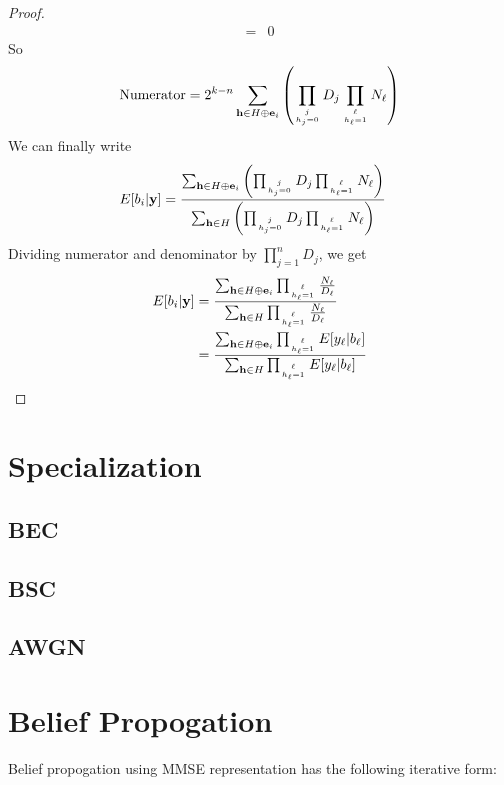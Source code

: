 \documentclass[12pt]{article}
\newcommand{\vect}[1]{\mathbf{#1}}
\begin{document}
\begin{proof}
\begin{align}
=&0
\end{align}
So
\begin{align}
\text{Numerator}=2^{k-n}\sum_{\vect{h}\in H\oplus\vect{e}_i}\left(\prod_{j\atop h_j = 0}D_j\prod_{\ell\atop h_\ell = 1} N_\ell\right)
\end{align}
We can finally write
\begin{align}
E[b_i|\vect{y}] &= \frac{\sum_{\vect{h}\in H\oplus\vect{e}_i}\left(\prod_{j\atop h_j = 0}D_j\prod_{\ell\atop h_\ell = 1} N_\ell\right)}{\sum_{\vect{h}\in H}\left(\prod_{j\atop h_j = 0}D_j\prod_{\ell\atop h_\ell = 1} N_\ell\right)}
\end{align}
Dividing numerator and denominator by $\prod_{j=1}^nD_j$, we get
\begin{align}
E[b_i|\vect{y}] &=\frac{\sum_{\vect{h}\in H\oplus\vect{e}_i}\prod_{\ell\atop h_\ell = 1} \frac{N_\ell}{D_\ell}}{\sum_{\vect{h}\in H}\prod_{\ell\atop h_\ell = 1} \frac{N_\ell}{D_\ell}}\\
&=\frac{\sum_{\vect{h}\in H\oplus\vect{e}_i}\prod_{\ell\atop h_\ell = 1} E[y_\ell|b_\ell]}{\sum_{\vect{h}\in H}\prod_{\ell\atop h_\ell = 1} E[y_\ell|b_\ell]}
\end{align}
\end{proof}
\section{Specialization}
\subsection{BEC}
\subsection{BSC}
\subsection{AWGN}
\section{Belief Propogation}
Belief propogation using MMSE representation has the following iterative form:
\end{document}
